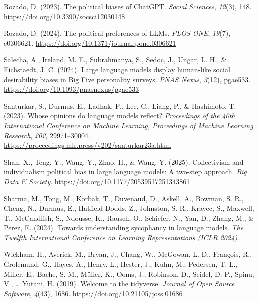 \documentclass[
]{article}
\newlength{\cslhangindent}
\newenvironment{CSLReferences}[2] %
 {\begin{list}{}{%
  \setlength{\itemindent}{0pt}
  \setlength{\leftmargin}{0pt}
  \setlength{\parsep}{0pt}
  \ifodd #1
   \setlength{\leftmargin}{\cslhangindent}
   \setlength{\itemindent}{-1\cslhangindent}
  \fi
  \setlength{\itemsep}{#2\baselineskip}}}
 {\end{list}}
\begin{document}
\begin{CSLReferences}{1}{0}
Rozado, D. (2023). The political biases of {ChatGPT}. \emph{Social
Sciences}, \emph{12}(3), 148.
\url{https://doi.org/10.3390/socsci12030148}

Rozado, D. (2024). The political preferences of {LLMs}. \emph{PLOS ONE},
\emph{19}(7), e0306621.
\url{https://doi.org/10.1371/journal.pone.0306621}

Salecha, A., Ireland, M. E., Subrahmanya, S., Sedoc, J., Ungar, L. H.,
\& Eichstaedt, J. C. (2024). Large language models display human-like
social desirability biases in {Big Five} personality surveys. \emph{PNAS
Nexus}, \emph{3}(12), pgae533.
\url{https://doi.org/10.1093/pnasnexus/pgae533}

Santurkar, S., Durmus, E., Ladhak, F., Lee, C., Liang, P., \& Hashimoto,
T. (2023). Whose opinions do language models reflect? \emph{Proceedings
of the 40th International Conference on Machine Learning, Proceedings of
Machine Learning Research}, \emph{202}, 29971--30004.
\url{https://proceedings.mlr.press/v202/santurkar23a.html}

Shan, X., Teng, Y., Wang, Y., Zhao, H., \& Wang, Y. (2025). Collectivism
and individualism political bias in large language models: A two-step
approach. \emph{Big Data \& Society}.
\url{https://doi.org/10.1177/20539517251343861}

Sharma, M., Tong, M., Korbak, T., Duvenaud, D., Askell, A., Bowman, S.
R., Cheng, N., Durmus, E., Hatfield-Dodds, Z., Johnston, S. R., Kravec,
S., Maxwell, T., McCandlish, S., Ndousse, K., Rausch, O., Schiefer, N.,
Yan, D., Zhang, M., \& Perez, E. (2024). Towards understanding
sycophancy in language models. \emph{The Twelfth International
Conference on Learning Representations (ICLR 2024)}.

Wickham, H., Averick, M., Bryan, J., Chang, W., McGowan, L. D.,
François, R., Grolemund, G., Hayes, A., Henry, L., Hester, J., Kuhn, M.,
Pedersen, T. L., Miller, E., Bache, S. M., Müller, K., Ooms, J.,
Robinson, D., Seidel, D. P., Spinu, V., \ldots{} Yutani, H. (2019).
Welcome to the tidyverse. \emph{Journal of Open Source Software},
\emph{4}(43), 1686. \url{https://doi.org/10.21105/joss.01686}

\end{CSLReferences}
\end{document}
